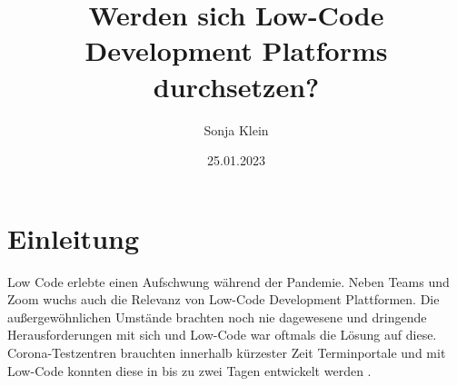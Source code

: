 \documentclass[12pt]{article} %
\title{Werden sich Low-Code Development Platforms durchsetzen?}
\author{Sonja Klein}
\date{25.01.2023}
\begin{document}
	
	
	
	
	
	
	
	\maketitle	
	\tableofcontents
	\newpage
	
	\section{Einleitung}
	Low Code erlebte einen Aufschwung während der Pandemie. Neben Teams und Zoom wuchs auch die Relevanz von Low-Code Development Plattformen. Die außergewöhnlichen Umstände brachten noch nie dagewesene und dringende Herausforderungen mit sich und Low-Code war oftmals die Lösung auf diese. Corona-Testzentren brauchten innerhalb kürzester Zeit Terminportale und mit Low-Code konnten diese in bis zu zwei Tagen entwickelt werden \cite{AmyGlasscock.2021}. \newline 
	
\end{document}
